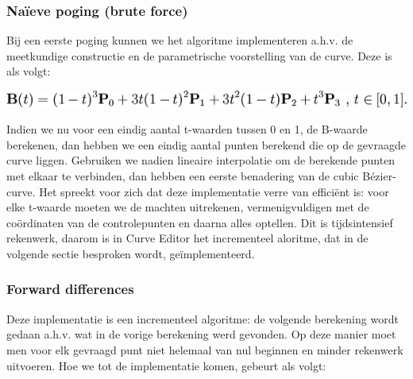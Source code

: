 \documentclass[a4paper,11pt,oneside, titlepage]{article}
\begin{document}
\subsubsection{Na\"ieve poging (brute force) \label{snp2}}
Bij een eerste poging kunnen we het algoritme implementeren a.h.v. de meetkundige constructie en de parametrische voorstelling van de curve.
Deze is als volgt:\newline
\begin{center}
\includegraphics[scale=0.45]{bezier.png}
\end{center}
Indien we nu voor een eindig aantal t-waarden tussen 0 en 1, de B-waarde berekenen, dan hebben we een eindig aantal punten berekend die op de gevraagde curve
liggen. Gebruiken we nadien lineaire interpolatie om de berekende punten met elkaar te verbinden, dan hebben een eerste benadering van de cubic B\'ezier-curve.
Het spreekt voor zich dat deze implementatie verre van effici\"ent is: voor elke t-waarde moeten we de machten uitrekenen, vermenigvuldigen met de co\"ordinaten van de controlepunten
en daarna alles optellen. Dit is tijdsintensief rekenwerk, daarom is in Curve Editor het incrementeel aloritme, dat in de volgende sectie besproken wordt, ge\"implementeerd.
\subsubsection{Forward differences \label{sfd}}
Deze implementatie is een incrementeel algoritme: de volgende berekening wordt gedaan a.h.v. wat in de vorige berekening werd gevonden. Op deze manier moet men voor elk gevraagd punt niet
helemaal van nul beginnen en minder rekenwerk uitvoeren. Hoe we tot de implementatie komen, gebeurt als volgt:
\end{document}
